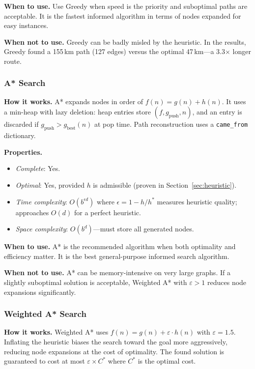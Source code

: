 ﻿\documentclass[a4paper, 12pt]{article}
\theoremstyle{remark}
\begin{document}
\textbf{When to use.} Use Greedy when speed is the priority and suboptimal paths are acceptable. It is the fastest informed algorithm in terms of nodes expanded for easy instances.

\textbf{When not to use.} Greedy can be badly misled by the heuristic. In the results, Greedy found a 155\,km path (127 edges) versus the optimal 47\,km---a 3.3$\times$ longer route.

\subsubsection{A* Search}

\textbf{How it works.} A* expands nodes in order of $f(n) = g(n) + h(n)$. It uses a min-heap with lazy deletion: heap entries store $(f, g_{\text{push}}, n)$, and an entry is discarded if $g_{\text{push}} > g_{\text{best}}(n)$ at pop time. Path reconstruction uses a \texttt{came\_from} dictionary.

\textbf{Properties.}
\begin{itemize}
    \item \emph{Complete}: Yes.
    \item \emph{Optimal}: Yes, provided $h$ is admissible (proven in Section~\ref{sec:heuristic}).
    \item \emph{Time complexity}: $O(b^{\epsilon d})$ where $\epsilon = 1 - h/h^*$ measures heuristic quality; approaches $O(d)$ for a perfect heuristic.
    \item \emph{Space complexity}: $O(b^d)$---must store all generated nodes.
\end{itemize}

\textbf{When to use.} A* is the recommended algorithm when both optimality and efficiency matter. It is the best general-purpose informed search algorithm.

\textbf{When not to use.} A* can be memory-intensive on very large graphs. If a slightly suboptimal solution is acceptable, Weighted A* with $\varepsilon > 1$ reduces node expansions significantly.

\subsubsection{Weighted A* Search}

\textbf{How it works.} Weighted A* uses $f(n) = g(n) + \varepsilon \cdot h(n)$ with $\varepsilon = 1.5$. Inflating the heuristic biases the search toward the goal more aggressively, reducing node expansions at the cost of optimality. The found solution is guaranteed to cost at most $\varepsilon \times C^*$ where $C^*$ is the optimal cost.
\end{document}
